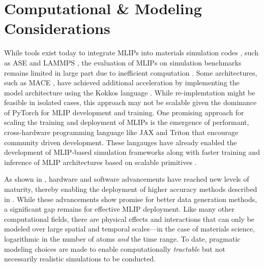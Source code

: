 \vspace{-0.2cm}
\section{Computational \& Modeling Considerations} \label{sec:computation}
\vspace{-0.1cm}

While tools exist today to integrate MLIPs into materials simulation codes \citep{gupta2024kusp}, such as ASE \citep{HjorthLarsen_2017} and LAMMPS \citep{thompson2022lammps}, the evaluation of MLIPs on simulation benchmarks remains limited in large part due to inefficient computation \citep{gonzales2024benchmarking}. Some architectures, such as MACE \citep{batatia2023foundation}, have achieved additional acceleration by implementing the model architecture using the Kokkos language \citep{9485033}. While re-implemtation might be feasible in isolated cases, this approach may not be scalable given the dominance of PyTorch for MLIP development and training.  
One promising approach for scaling the training and deployment of MLIPs is the emergence of performant, cross-hardware programming language like JAX \citep{jax2018github} and Triton \citep{tillet2019triton} that encourage community driven development. These langauges have already enabled the development of MLIP-based simulation frameworks \citep{schoenholz2020jax, Hu2020DiffTaichi:, helal2024mess, doerr2021torchmd} along with faster training and inference of MLIP architectures based on scalable primitives \citep{lee2024scaling}.

As shown in , hardware and software advancements have reached new levels of maturity, thereby enabling the deployment of higher accuracy methods described in . While these advancements show promise for better data generation methods, a significant gap remains for effective MLIP deployment. Like many other computational fields, there are physical effects and interactions that can only be modeled over large spatial and temporal scales---in the case of materials science, logarithmic in the number of atoms \emph{and} the time range. To date, pragmatic modeling choices are made to enable computationally \emph{tractable} but not necessarily realistic simulations to be conducted. 

